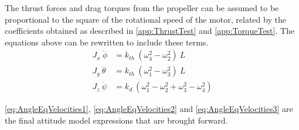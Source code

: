 The thrust forces and drag torques from the propeller can be assumed to be proportional to the square of the rotational speed of the motor, related by the coefficients obtained as described in \autoref{app:ThrustTest} and \ref{app:TorqueTest}. The equations above can be rewritten to include these terms.
%
\begin{align}
J_x\ \ddot{\phi}&=k_{th} \ (\omega^2_4-\omega^2_2) \  L \label{eq:AngleEqVelocities1}\\
J_y \ \ddot{\theta}&=k_{th} \ (\omega^2_1-\omega^2_3) \  L \label{eq:AngleEqVelocities2} \\
J_z\ \ddot{\psi}&=k_d \ (\omega^2_1-\omega^2_2+\omega^2_3-\omega^2_4)
\label{eq:AngleEqVelocities3}
\end{align}
\begin{where}
\end{where}

\autoref{eq:AngleEqVelocities1}, \autoref{eq:AngleEqVelocities2} 
and \autoref{eq:AngleEqVelocities3} are the final attitude model expressions that are brought forward. %
